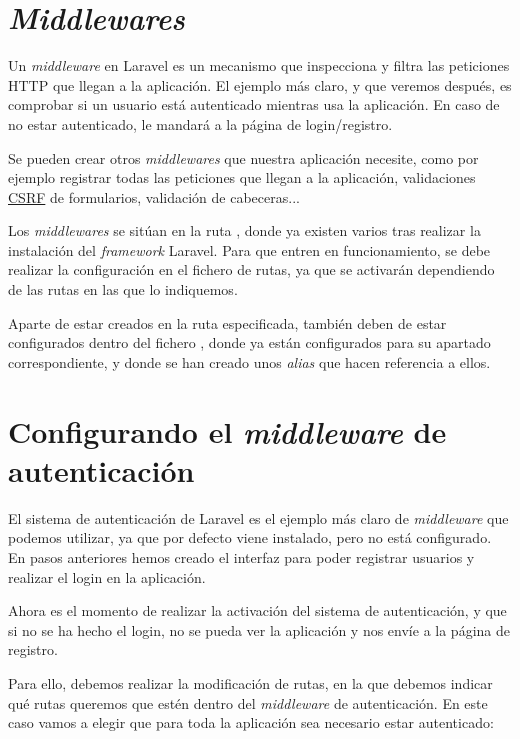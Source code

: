 \chapter{\textit{Middlewares}}

Un \textit{middleware} en Laravel es un mecanismo que inspecciona y filtra las peticiones HTTP que llegan a la aplicación. El ejemplo más claro, y que veremos después, es comprobar si un usuario está autenticado mientras usa la aplicación. En caso de no estar autenticado, le mandará a la página de login/registro.

Se pueden crear otros \textit{middlewares} que nuestra aplicación necesite, como por ejemplo registrar todas las peticiones que llegan a la aplicación, validaciones \href{https://es.wikipedia.org/wiki/Cross-site_request_forgery}{CSRF} de formularios, validación de cabeceras...

Los \textit{middlewares} se sitúan en la ruta , donde ya existen varios tras realizar la instalación del \textit{framework} Laravel. Para que entren en funcionamiento, se debe realizar la configuración en el fichero de rutas, ya que se activarán dependiendo de las rutas en las que lo indiquemos.

Aparte de estar creados en la ruta especificada, también deben de estar configurados dentro del fichero , donde ya están configurados para su apartado correspondiente, y donde se han creado unos \textit{alias} que hacen referencia a ellos.

\chapter{Configurando el \textit{middleware} de autenticación}

El sistema de autenticación de Laravel es el ejemplo más claro de \textit{middleware} que podemos utilizar, ya que por defecto viene instalado, pero no está configurado. En pasos anteriores hemos creado el interfaz para poder registrar usuarios y realizar el login en la aplicación.

Ahora es el momento de realizar la activación del sistema de autenticación, y que si no se ha hecho el login, no se pueda ver la aplicación y nos envíe a la página de registro.

Para ello, debemos realizar la modificación de rutas, en la que debemos indicar qué rutas queremos que estén dentro del \textit{middleware} de autenticación. En este caso vamos a elegir que para toda la aplicación sea necesario estar autenticado:


